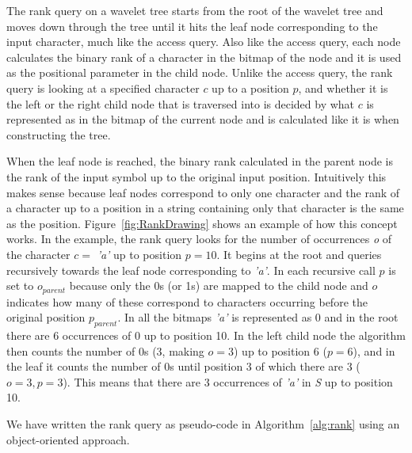 The rank query on a wavelet tree starts from the root of the wavelet tree and moves down through the tree until it hits the leaf node corresponding to the input character, much like the access query.
Also like the access query, each node calculates the binary rank of a character in the bitmap of the node and it is used as the positional parameter in the child node.
Unlike the access query, the rank query is looking at a specified character $c$ up to a position $p$, and whether it is the left or the right child node that is traversed into is decided by what $c$ is represented as in the bitmap of the current node and is calculated like it is when constructing the tree.

When the leaf node is reached, the binary rank calculated in the parent node is the rank of the input symbol up to the original input position.
Intuitively this makes sense because leaf nodes correspond to only one character and the rank of a character up to a position in a string containing only that character is the same as the position.
Figure~\ref{fig:RankDrawing} shows an example of how this concept works.
In the example, the rank query looks for the number of occurrences \textit{o} of the character $c = $ \textit{'a'} up to position $p = 10$.
It begins at the root and queries recursively towards the leaf node corresponding to \textit{'a'}. 
In each recursive call $p$ is set to $o_{parent}$ because only the 0s (or 1s) are mapped to the child node and $o$ indicates how many of these correspond to characters occurring before the original position $p_{parent}$.
In all the bitmaps \textit{'a'} is represented as 0 and in the root there are 6 occurrences of 0 up to position 10. 
In the left child node the algorithm then counts the number of 0s (3, making $o=3$) up to position 6 ($p=6$), and in the leaf it counts the number of 0s until position 3 of which there are 3 ($o=3, p=3$). 
This means that there are 3 occurrences of \textit{'a'} in \textit{S} up to position 10.

We have written the rank query as pseudo-code in Algorithm~\ref{alg:rank} using an object-oriented approach.

